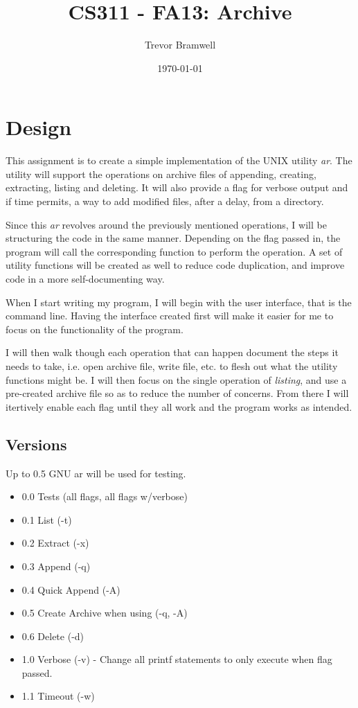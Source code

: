 \documentclass[letterpaper,10pt]{article}
\title{CS311 - FA13: Archive}
\date{\today}
\author{Trevor Bramwell}
\begin{document}
\maketitle

\section{Design}
    This assignment is to create a simple implementation of the UNIX
    utility \emph{ar}. The utility will support the operations on archive files
    of appending, creating, extracting, listing and deleting. It will
    also provide a flag for verbose output and if time permits, a way to
    add modified files, after a delay, from a directory.

    Since this \emph{ar} revolves around the previously mentioned
    operations, I will be structuring the code in the same manner.
    Depending on the flag passed in, the program will call the
    corresponding function to perform the operation. A set of utility
    functions will be created as well to reduce code duplication, and
    improve code in a more self-documenting way.

    When I start writing my program, I will begin with the user
    interface, that is the command line. Having the interface created
    first will make it easier for me to focus on the functionality of
    the program.

    I will then walk though each operation that can happen document the
    steps it needs to take, i.e. open archive file, write file, etc. to
    flesh out what the utility functions might be. I will then focus on
    the single operation of \emph{listing}, and use a pre-created
    archive file so as to reduce the number of concerns. From there I
    will itertively enable each flag until they all work and the program
    works as intended.

\subsection{Versions}

Up to 0.5 GNU ar will be used for testing.

\begin{itemize}
    \item 0.0 Tests (all flags, all flags w/verbose)
    \item 0.1 List (-t)
    \item 0.2 Extract (-x)
    \item 0.3 Append (-q)
    \item 0.4 Quick Append (-A)
    \item 0.5 Create Archive when using (-q, -A)
    \item 0.6 Delete (-d)
    \item 1.0 Verbose (-v) - Change all printf statements to only execute when flag
          passed.
    \item 1.1 Timeout (-w)
\end{itemize}
        
\end{document}
